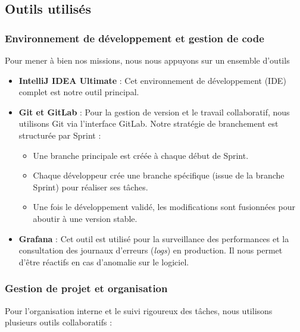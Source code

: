 \documentclass{article}
\begin{document}
\subsection{Outils utilisés}

\subsubsection{Environnement de développement et gestion de code}

Pour mener à bien nos missions, nous nous appuyons sur un ensemble d'outils

\begin{itemize}
    \item \textbf{IntelliJ IDEA Ultimate} : Cet environnement de développement (IDE) complet est notre outil principal.
    
    \item \textbf{Git et GitLab} : Pour la gestion de version et le travail collaboratif, nous utilisons Git via l'interface GitLab. Notre stratégie de branchement est structurée par Sprint :
    \begin{itemize}
        \item Une branche principale est créée à chaque début de Sprint.
        \item Chaque développeur crée une branche spécifique (issue de la branche Sprint) pour réaliser ses tâches.
        \item Une fois le développement validé, les modifications sont fusionnées pour aboutir à une version stable.
    \end{itemize}

    \item \textbf{Grafana} : Cet outil est utilisé pour la surveillance des performances et la consultation des journaux d'erreurs (\textit{logs}) en production. Il nous permet d'être réactifs en cas d'anomalie sur le logiciel.
\end{itemize}

\newpage

\subsubsection{Gestion de projet et organisation}

Pour l'organisation interne et le suivi rigoureux des tâches, nous utilisons plusieurs outils collaboratifs :
\end{document}
